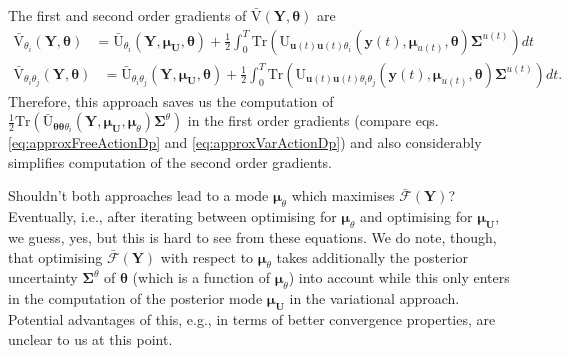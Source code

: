 \documentclass[a4paper,10pt]{article}
\newcommand{\bs}[1]{\mathbf{#1}}					%
\newcommand{\bgs}[1]{\boldsymbol{#1}}				%
\newcommand{\trace}[1]{\mathrm{Tr}\left(#1\right)}					%
\renewcommand{\ss}{u}         %
\newcommand{\so}{y}         %
\renewcommand{\sp}{\theta}    %
\newcommand{\ps}{\bs{\ss}}    %
\newcommand{\po}{\bs{\so}}    %
\newcommand{\pp}{\bgs{\sp}} %
\newcommand{\Ps}{\bs{U}}    %
\newcommand{\Po}{\bs{Y}}    %
\newcommand{\U}{\mathrm{U}}			%
\newcommand{\Ua}{\bar{\mathrm{U}}}		%
\newcommand{\Va}{\bar{\mathrm{V}}}		%
\newcommand{\Fa}{\bar{\mathcal{F}}}		%
\newcommand{\Cov}{\bgs{\Sigma}}			%
\begin{document}
The first and second order gradients of $\Va(\Po,\pp)$ are
\begin{align}
    \Va_{\sp_i}(\Po,\pp) &= \label{eq:approxVarActionDp} \Ua_{\sp_i}(\Po,\bgs{\mu}_\Ps,\pp) + \frac{1}{2}\int_0^T \trace{\U_{\ps(t)\ps(t)\sp_i}(\po(t),\bgs{\mu}_{\ss(t)},\pp)\Cov^{\ss(t)}}dt
\end{align}
\begin{align}
    \Va_{\sp_i\sp_j}(\Po,\pp) &= \label{eq:approxVarActionDpp} \Ua_{\sp_i\sp_j}(\Po,\bgs{\mu}_\Ps,\pp) + \frac{1}{2}\int_0^T \trace{\U_{\ps(t)\ps(t)\sp_i\sp_j}(\po(t),\bgs{\mu}_{\ss(t)},\pp)\Cov^{\ss(t)}}dt.
\end{align}
Therefore, this approach saves us the computation of $\frac{1}{2}\trace{\Ua_{\pp\pp\sp_i}(\Po,\bgs{\mu}_\Ps,\bgs{\mu}_\sp)\Cov^\sp}$ in the first order gradients (compare eqs. \ref{eq:approxFreeActionDp} and \ref{eq:approxVarActionDp}) and also considerably simplifies computation of the second order gradients. 

Shouldn't both approaches lead to a mode $\bgs{\mu}_\sp$ which maximises $\Fa(\Po)$? Eventually, i.e., after iterating between optimising for $\bgs{\mu}_\sp$ and optimising for $\bgs{\mu}_\Ps$, we guess, yes, but this is hard to see from these equations. We do note, though, that optimising $\Fa(\Po)$ with respect to $\bgs{\mu}_\sp$ takes additionally the posterior uncertainty $\Cov^\sp$ of $\pp$ (which is a function of $\bgs{\mu}_\sp$) into account while this only enters in the computation of the posterior mode $\bgs{\mu}_\Ps$ in the variational approach. Potential advantages of this, e.g., in terms of better convergence properties, are unclear to us at this point.
\end{document}
